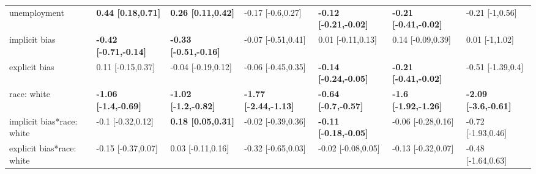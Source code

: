 \documentclass[]{article}
\theoremstyle{definition}
\theoremstyle{definition}
\theoremstyle{remark}
\begin{document}
\begin{landscape}
\begin{table}
{\begin{tabular}[t]{lllllll}
unemployment & \textbf{0.44 [0.18,0.71]} & \textbf{0.26 [0.11,0.42]} & -0.17 [-0.6,0.27] & \textbf{-0.12 [-0.21,-0.02]} & \textbf{-0.21 [-0.41,-0.02]} & -0.21 [-1,0.56]\\
implicit bias & \textbf{-0.42 [-0.71,-0.14]} & \textbf{-0.33 [-0.51,-0.16]} & -0.07 [-0.51,0.41] & 0.01 [-0.11,0.13] & 0.14 [-0.09,0.39] & 0.01 [-1,1.02]\\
\addlinespace
explicit bias & 0.11 [-0.15,0.37] & -0.04 [-0.19,0.12] & -0.06 [-0.45,0.35] & \textbf{-0.14 [-0.24,-0.05]} & \textbf{-0.21 [-0.41,-0.02]} & -0.51 [-1.39,0.4]\\
race: white & \textbf{-1.06 [-1.4,-0.69]} & \textbf{-1.02 [-1.2,-0.82]} & \textbf{-1.77 [-2.44,-1.13]} & \textbf{-0.64 [-0.7,-0.57]} & \textbf{-1.6 [-1.92,-1.26]} & \textbf{-2.09 [-3.6,-0.61]}\\
implicit bias*race: white & -0.1 [-0.32,0.12] & \textbf{0.18 [0.05,0.31]} & -0.02 [-0.39,0.36] & \textbf{-0.11 [-0.18,-0.05]} & -0.06 [-0.28,0.16] & -0.72 [-1.93,0.46]\\
explicit bias*race: white & -0.15 [-0.37,0.07] & 0.03 [-0.11,0.16] & -0.32 [-0.65,0.03] & -0.02 [-0.08,0.05] & -0.13 [-0.32,0.07] & -0.48 [-1.64,0.63]\\
\bottomrule
\end{tabular}}
\end{table}
\end{landscape}
\end{document}
